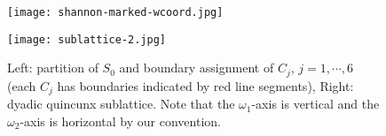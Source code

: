 \begin{figure}[!t]
\centering
\begin{minipage}[c]{.35\textwidth}
\texttt{[image: shannon-marked-wcoord.jpg]}
\end{minipage}\hspace*{3em}
\begin{minipage}[c]{.25\textwidth}
\texttt{[image: sublattice-2.jpg]}
\vspace*{1em}
\end{minipage}
\caption{Left: partition of $S_0$ and boundary assignment of $C_j$, $j = 1,\cdots,6$ (each $C_j$ has boundaries indicated by red line segments), Right: dyadic quincunx sublattice. Note that the $\omega_1$-axis is vertical and the $\omega_2$-axis is horizontal by our convention.}
\label{fig: partition}
\vspace*{-5mm}
\end{figure}



